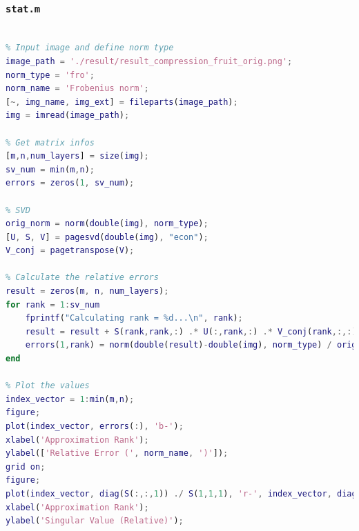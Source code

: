 \documentclass[12pt]{article}
\theoremstyle{definition}
\begin{document}
\subsubsection*{\texttt{stat.m}}
\begin{lstlisting}[language=Matlab, style=mystyle]
% stat.m

% Input image and define norm type
image_path = './result/result_compression_fruit_orig.png';
norm_type = 'fro';
norm_name = 'Frobenius norm';
[~, img_name, img_ext] = fileparts(image_path);
img = imread(image_path);

% Get matrix infos
[m,n,num_layers] = size(img);
sv_num = min(m,n);
errors = zeros(1, sv_num);

% SVD
orig_norm = norm(double(img), norm_type);
[U, S, V] = pagesvd(double(img), "econ");
V_conj = pagetranspose(V);

% Calculate the relative errors
result = zeros(m, n, num_layers);
for rank = 1:sv_num
    fprintf("Calculating rank = %d...\n", rank);
    result = result + S(rank,rank,:) .* U(:,rank,:) .* V_conj(rank,:,:);
    errors(1,rank) = norm(double(result)-double(img), norm_type) / orig_norm;
end

% Plot the values
index_vector = 1:min(m,n);
figure;
plot(index_vector, errors(:), 'b-');
xlabel('Approximation Rank');
ylabel(['Relative Error (', norm_name, ')']);
grid on;
figure;
plot(index_vector, diag(S(:,:,1)) ./ S(1,1,1), 'r-', index_vector, diag(S(:,:,2)) ./ S(1,1,2), 'g-', index_vector, diag(S(:,:,3)) ./ S(1,1,3), 'b-');
xlabel('Approximation Rank');
ylabel('Singular Value (Relative)');
\end{lstlisting}
\end{document}
